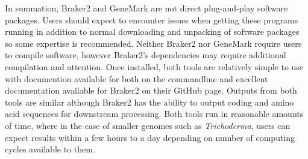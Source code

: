 In summation, Braker2 and GeneMark are not direct plug-and-play
software packages. Users should expect to encounter issues when
getting these programs running in addition to normal downloading and
unpacking of software packages so some expertise is
recommended. Neither Braker2 nor GeneMark require users to compile
software, however Braker2's dependencies may require additional
compilation and attention. Once installed, both tools are relatively
simple to use with documention available for both on the commandline
and excellent documentation available for Braker2 on their GitHub
page. Outputs from both tools are similar although Braker2 has the
ability to output coding and amino acid sequences for downstream
processing. Both tools run in reasonable amounts of time, where in the
case of smaller genomes such as \textit{Trichoderma}, users can expect
results within a few hours to a day depending on number of computing
cycles available to them.
